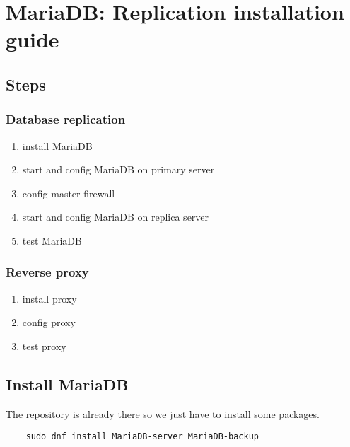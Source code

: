 
\section{MariaDB: Replication installation guide}
\label{sec: replication-installation-guide}

\subsection{Steps}

\subsubsection{Database replication}

\begin{enumerate}
    \item install MariaDB
    \item start and config MariaDB on primary server
    \item config master firewall
    \item start and config MariaDB on replica server
    \item test MariaDB
\end{enumerate}

\subsubsection{Reverse proxy}

\begin{enumerate}
    \item install proxy
    \item config proxy
    \item test proxy
\end{enumerate}

\subsection{Install MariaDB}

The repository is already there so we just have to install some packages.

\begin{lstlisting}
    sudo dnf install MariaDB-server MariaDB-backup
\end{lstlisting}

